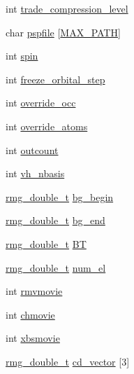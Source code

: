\begin{DoxyCompactItemize}
\item 
int \hyperlink{struct_c_o_n_t_r_o_l_a2ee1b0f0ec4ceb8f4d442685caa759d0}{trade\-\_\-compression\-\_\-level}
\item 
char \hyperlink{struct_c_o_n_t_r_o_l_a9fd59b68564856c8e8f3c3348499bc41}{pspfile} \mbox{[}\hyperlink{_t_d_d_f_t_2_headers_2params_8h_ab99ded389af74001a6298fc9e44e74e5}{M\-A\-X\-\_\-\-P\-A\-T\-H}\mbox{]}
\item 
int \hyperlink{struct_c_o_n_t_r_o_l_a6f3eab1adde3e0854758cc3ef75c7b5a}{spin}
\item 
int \hyperlink{struct_c_o_n_t_r_o_l_a01cf241357ae8bd7092fa5a7de170877}{freeze\-\_\-orbital\-\_\-step}
\item 
int \hyperlink{struct_c_o_n_t_r_o_l_aacb1cdcad427398239edced94568d1ff}{override\-\_\-occ}
\item 
int \hyperlink{struct_c_o_n_t_r_o_l_a3fe7c8607039b32ed0bb9372ab667385}{override\-\_\-atoms}
\item 
int \hyperlink{struct_c_o_n_t_r_o_l_a2c7b7be53fee7f9d071cc1f99d30442e}{outcount}
\item 
int \hyperlink{struct_c_o_n_t_r_o_l_a3f8de26c496463e31095dc178aa7e8ab}{vh\-\_\-nbasis}
\item 
\hyperlink{rmgtypes_8h_aaa16921c14f121c56eaa42390a340db8}{rmg\-\_\-double\-\_\-t} \hyperlink{struct_c_o_n_t_r_o_l_a2bcd09ba4fc0385935ea7c771c18d56a}{bg\-\_\-begin}
\item 
\hyperlink{rmgtypes_8h_aaa16921c14f121c56eaa42390a340db8}{rmg\-\_\-double\-\_\-t} \hyperlink{struct_c_o_n_t_r_o_l_a99f920243f19e4630b1db5855b3c3e45}{bg\-\_\-end}
\item 
\hyperlink{rmgtypes_8h_aaa16921c14f121c56eaa42390a340db8}{rmg\-\_\-double\-\_\-t} \hyperlink{struct_c_o_n_t_r_o_l_a531be14b27e46507a6bdc62f36d58baa}{B\-T}
\item 
\hyperlink{rmgtypes_8h_aaa16921c14f121c56eaa42390a340db8}{rmg\-\_\-double\-\_\-t} \hyperlink{struct_c_o_n_t_r_o_l_a0a02030da34bd8bd2aefcbbf1eb53db2}{num\-\_\-el}
\item 
int \hyperlink{struct_c_o_n_t_r_o_l_a5a8b93668929030fade55724acc0e6c0}{rmvmovie}
\item 
int \hyperlink{struct_c_o_n_t_r_o_l_a4e08917564879955569c6a1fa49f2731}{chmovie}
\item 
int \hyperlink{struct_c_o_n_t_r_o_l_a6effa1d251584fcfe96f251d653f314f}{xbsmovie}
\item 
\hyperlink{rmgtypes_8h_aaa16921c14f121c56eaa42390a340db8}{rmg\-\_\-double\-\_\-t} \hyperlink{struct_c_o_n_t_r_o_l_a41fd3ee88c5ee1fbd1a86e4a2496b730}{cd\-\_\-vector} \mbox{[}3\mbox{]}

\end{DoxyCompactItemize}
